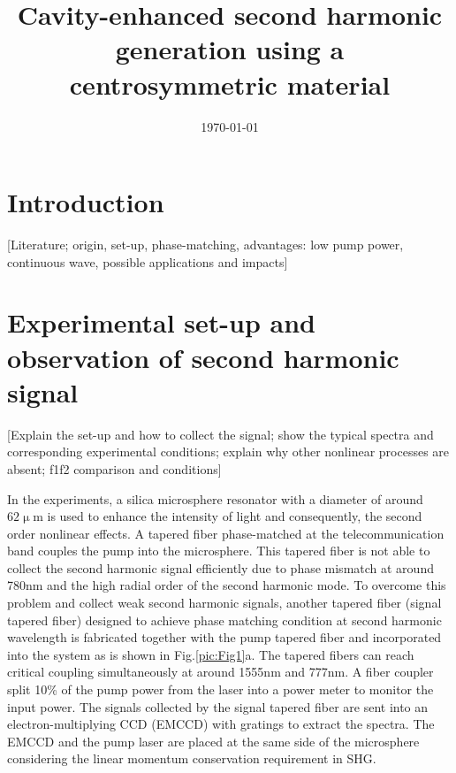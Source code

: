 \documentclass[a4paper,8pt,hyperref, twocolumn]{article}
\title{\bfseries \Large Cavity-enhanced second harmonic generation using a centrosymmetric material}
\date{\normalsize \today}
\begin{document}
\maketitle

\section{Introduction}

[Literature; origin, set-up, phase-matching, advantages: low pump power, continuous wave, possible applications and impacts]


\section{Experimental set-up and observation of second harmonic signal}
[Explain the set-up and how to collect the signal; show the typical spectra and corresponding experimental conditions; explain why other nonlinear processes are absent; f1f2 comparison and conditions]

In the experiments, a silica microsphere resonator with a diameter of around $62\upmu$m is used to enhance the intensity of light and  consequently, the second order nonlinear effects. A tapered fiber phase-matched at the telecommunication band couples the pump into the microsphere\cite{knight1997phase, cai2000observation}. This tapered fiber is not able to collect the second harmonic signal efficiently due to phase mismatch at around 780nm and the high radial order of the second harmonic mode\cite{carmon2007visible}. To overcome this problem and collect weak second harmonic signals, another tapered fiber (signal tapered fiber) designed to achieve phase matching condition at second harmonic wavelength is fabricated together with the pump tapered fiber and incorporated into the system as is shown in Fig.\ref{pic:Fig1}a. The tapered fibers can reach critical coupling simultaneously at around 1555nm and 777nm. A fiber coupler split 10\% of the pump power from the laser into a power meter to monitor the input power. The signals collected by the signal tapered fiber are sent into an electron-multiplying CCD (EMCCD) with gratings to extract the spectra. The EMCCD and the pump laser are placed at the same side of the microsphere considering the linear momentum conservation requirement in SHG\cite{carmon2007visible, kozyreff2008whispering}.
\end{document}
